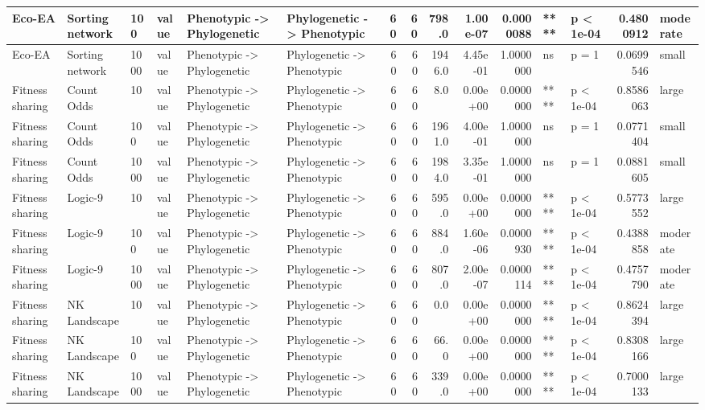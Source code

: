 \documentclass[]{book}
\begin{document}
\begin{table}
\begin{tabular}[t]{l|l|l|l|l|l|r|r|r|r|r|l|l|r|l}
\hline
Eco-EA & Sorting network & 100 & value & Phenotypic
    ->
Phylogenetic & Phylogenetic
    ->
Phenotypic & 60 & 60 & 798.0 & 1.00e-07 & 0.0000088 & **** & p < 1e-04 & 0.4800912 & moderate\\
\hline
Eco-EA & Sorting network & 1000 & value & Phenotypic
    ->
Phylogenetic & Phylogenetic
    ->
Phenotypic & 60 & 60 & 1946.0 & 4.45e-01 & 1.0000000 & ns & p = 1 & 0.0699546 & small\\
\hline
Fitness sharing & Count Odds & 10 & value & Phenotypic
    ->
Phylogenetic & Phylogenetic
    ->
Phenotypic & 60 & 60 & 8.0 & 0.00e+00 & 0.0000000 & **** & p < 1e-04 & 0.8586063 & large\\
\hline
Fitness sharing & Count Odds & 100 & value & Phenotypic
    ->
Phylogenetic & Phylogenetic
    ->
Phenotypic & 60 & 60 & 1961.0 & 4.00e-01 & 1.0000000 & ns & p = 1 & 0.0771404 & small\\
\hline
Fitness sharing & Count Odds & 1000 & value & Phenotypic
    ->
Phylogenetic & Phylogenetic
    ->
Phenotypic & 60 & 60 & 1984.0 & 3.35e-01 & 1.0000000 & ns & p = 1 & 0.0881605 & small\\
\hline
Fitness sharing & Logic-9 & 10 & value & Phenotypic
    ->
Phylogenetic & Phylogenetic
    ->
Phenotypic & 60 & 60 & 595.0 & 0.00e+00 & 0.0000000 & **** & p < 1e-04 & 0.5773552 & large\\
\hline
Fitness sharing & Logic-9 & 100 & value & Phenotypic
    ->
Phylogenetic & Phylogenetic
    ->
Phenotypic & 60 & 60 & 884.0 & 1.60e-06 & 0.0000930 & **** & p < 1e-04 & 0.4388858 & moderate\\
\hline
Fitness sharing & Logic-9 & 1000 & value & Phenotypic
    ->
Phylogenetic & Phylogenetic
    ->
Phenotypic & 60 & 60 & 807.0 & 2.00e-07 & 0.0000114 & **** & p < 1e-04 & 0.4757790 & moderate\\
\hline
Fitness sharing & NK Landscape & 10 & value & Phenotypic
    ->
Phylogenetic & Phylogenetic
    ->
Phenotypic & 60 & 60 & 0.0 & 0.00e+00 & 0.0000000 & **** & p < 1e-04 & 0.8624394 & large\\
\hline
Fitness sharing & NK Landscape & 100 & value & Phenotypic
    ->
Phylogenetic & Phylogenetic
    ->
Phenotypic & 60 & 60 & 66.0 & 0.00e+00 & 0.0000000 & **** & p < 1e-04 & 0.8308166 & large\\
\hline
Fitness sharing & NK Landscape & 1000 & value & Phenotypic
    ->
Phylogenetic & Phylogenetic
    ->
Phenotypic & 60 & 60 & 339.0 & 0.00e+00 & 0.0000000 & **** & p < 1e-04 & 0.7000133 & large\\
\hline

\end{tabular}
\end{table}
\end{document}
